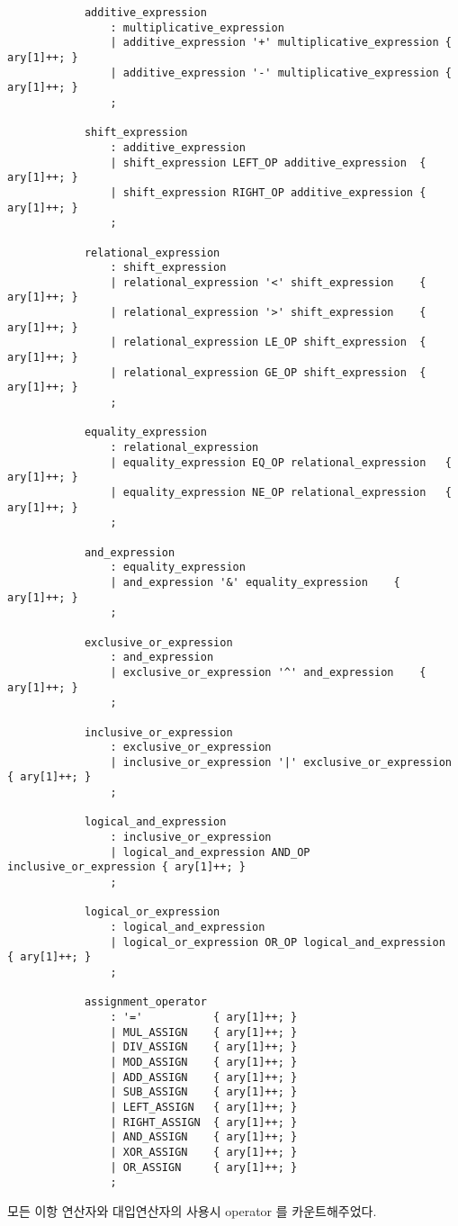 \documentclass{article}
\begin{document}
\begin{itemize}
\begin{itemize}
\begin{itemize}
\begin{lstlisting}
			additive_expression
				: multiplicative_expression
				| additive_expression '+' multiplicative_expression	{ ary[1]++; }
				| additive_expression '-' multiplicative_expression	{ ary[1]++; }
				;

			shift_expression
				: additive_expression
				| shift_expression LEFT_OP additive_expression	{ ary[1]++; }
				| shift_expression RIGHT_OP additive_expression	{ ary[1]++; }
				;

			relational_expression
				: shift_expression
				| relational_expression '<' shift_expression	{ ary[1]++; }
				| relational_expression '>' shift_expression	{ ary[1]++; }
				| relational_expression LE_OP shift_expression	{ ary[1]++; }
				| relational_expression GE_OP shift_expression	{ ary[1]++; }
				;

			equality_expression
				: relational_expression
				| equality_expression EQ_OP relational_expression	{ ary[1]++; }
				| equality_expression NE_OP relational_expression	{ ary[1]++; }
				;

			and_expression
				: equality_expression
				| and_expression '&' equality_expression	{ ary[1]++; }
				;

			exclusive_or_expression
				: and_expression
				| exclusive_or_expression '^' and_expression	{ ary[1]++; }
				;

			inclusive_or_expression
				: exclusive_or_expression
				| inclusive_or_expression '|' exclusive_or_expression	{ ary[1]++; }
				;

			logical_and_expression
				: inclusive_or_expression
				| logical_and_expression AND_OP inclusive_or_expression	{ ary[1]++; }
				;

			logical_or_expression
				: logical_and_expression
				| logical_or_expression OR_OP logical_and_expression	{ ary[1]++; }
				;

			assignment_operator
				: '='			{ ary[1]++; }
				| MUL_ASSIGN	{ ary[1]++; }
				| DIV_ASSIGN	{ ary[1]++; }
				| MOD_ASSIGN	{ ary[1]++; }
				| ADD_ASSIGN	{ ary[1]++; }
				| SUB_ASSIGN	{ ary[1]++; }
				| LEFT_ASSIGN	{ ary[1]++; }
				| RIGHT_ASSIGN	{ ary[1]++; }
				| AND_ASSIGN	{ ary[1]++; }
				| XOR_ASSIGN	{ ary[1]++; }
				| OR_ASSIGN		{ ary[1]++; }
				;
			\end{lstlisting}
			모든 이항 연산자와 대입연산자의 사용시 operator 를 카운트해주었다.
		\end{itemize}


\end{itemize}
\end{itemize}
\end{document}
